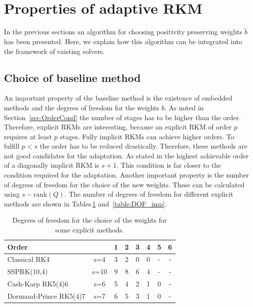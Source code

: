 \documentclass[a4paper]{article}
\numberwithin{equation}{section}
\theoremstyle{plain}
\theoremstyle{definition}
\numberwithin{theorem}{section}
\newcommand{\1}{\mathbbm{1}}
\begin{document}
\section{Properties of adaptive RKM} \label{sec:integration}

In the previous sections an algorithm for choosing positivity preserving weights $\tilde{b}$ has been presented.
Here, we explain how this algorithm can be integrated into the framework of existing solvers.

\subsection{Choice of baseline method}
An important property of the baseline method is the existence of embedded methods and the degrees of freedom for the weights $b$.
As noted in Section~\ref{sec:OrderCond} the number of stages has to be higher than the order.
Therefore, explicit RKMs are interesting, because an explicit RKM of order $p$ requires at least $p$ stages.
Fully implicit RKMs can achieve higher orders.
To fulfill $p<s$ the order has to be reduced drastically. Therefore, these methods are not good candidates for the adaptation. 
As stated in \cite{norsett_attainable_1977} the highest achievable order of a diagonally implicit RKM is $s+1$. This condition is far closer to the condition required for the adaptation.
Another important property is the number of degrees of freedom for the choice of the new weights.  
These can be calculated using $s-\mathrm{rank}(Q)$. %
The number of degrees of freedom for different explicit methods are shown in Tables\,\ref{table:DOF_exp} and~\ref{table:DOF_imp}.
 
\begin{table}[h!]
\centering    %
\begin{tabular}{|l c|c c c c c c |} 
 \hline 
Order & &1&2&3&4&5&6 \\ 
 \hline Classical RK4& s=4&3&2&0&0& - & -  \\ 
 SSPRK(10,4)& s=10&9&8&6&4& - & -  \\ 
 Cash-Karp RK5(4)6& s=6&5&4&2&1&0& -  \\ 
 Dormand-Prince RK5(4)7& s=7&6&5&3&1&0& -  \\ 
 \hline 
 \end{tabular}
 \caption{Degrees of freedom for the choice of the weights for some explicit methods.} %
 \label{table:DOF_exp}
 \end{table}
 
\end{document}
